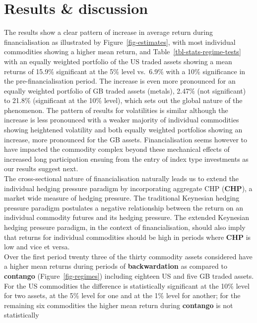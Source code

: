 \documentclass[
  authoryear,
  preprint,
  3p]{elsarticle}
\begin{document}
\newpage

\section{Results \& discussion}\label{sec-results}

The results show a clear pattern of increase in average return during
financialisation as illustrated by Figure~\ref{fig-estimates}, with most
individual commodities showing a higher mean return, and
Table~\ref{tbl-stats-regime-tests} with an equally weighted portfolio of
the US traded assets showing a mean returns of 15.9\% significant at the
5\% level vs.~6.9\% with a 10\% significance in the pre-financialisation
period. The increase is even more pronounced for an equally weighted
portfolio of GB traded assets (metals), 2.47\% (not significant) to
21.8\% (significant at the 10\% level), which sets out the global nature
of the phenomenon. The pattern of results for volatilities is similar
although the increase is less pronounced with a weaker majority of
individual commodities showing heightened volatility and both equally
weighted portfolios showing an increase, more pronounced for the GB
assets. Financialisation seems however to have impacted the commodity
complex beyond these mechanical effects of increased long participation
ensuing from the entry of index type investments as our results suggest
next.\\
The cross-sectional nature of financialisation naturally leads us to
extend the individual hedging pressure paradigm by incorporating
aggregate CHP (\textbf{CHP}), a market wide measure of hedging pressure.
The traditional Keynesian hedging pressure paradigm postulates a
negative relationship between the return on an individual commodity
futures and its hedging pressure. The extended Keynesian hedging
pressure paradigm, in the context of financialisation, should also imply
that returns for individual commodities should be high in periods where
\textbf{CHP} is low and vice et versa.\\
Over the first period twenty three of the thirty commodity assets
considered have a higher mean returns during periods of
\textbf{backwardation} as compared to \textbf{contango}
(Figure~\ref{fig-regimes}) including eighteen US and five GB traded
assets. For the US commodities the difference is statistically
significant at the 10\% level for two assets, at the 5\% level for one
and at the 1\% level for another; for the remaining six commodities the
higher mean return during \textbf{contango} is not statistically
\end{document}
